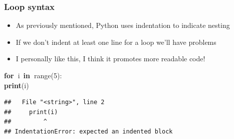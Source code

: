 \documentclass{beamer}\usepackage[]{graphicx}\usepackage[]{color}
\makeatletter
\newcommand{\hlnum}[1]{\textcolor[rgb]{0.686,0.059,0.569}{#1}}%
\newcommand{\hlopt}[1]{\textcolor[rgb]{0,0,0}{#1}}%
\newcommand{\hlstd}[1]{\textcolor[rgb]{0.345,0.345,0.345}{#1}}%
\newcommand{\hlkwa}[1]{\textcolor[rgb]{0.161,0.373,0.58}{\textbf{#1}}}%
\newcommand{\hlkwb}[1]{\textcolor[rgb]{0.69,0.353,0.396}{#1}}%
\newenvironment{kframe}{%
 \def\at@end@of@kframe{}%
 \ifinner\ifhmode%
  \def\at@end@of@kframe{\end{minipage}}%
  \begin{minipage}{\columnwidth}%
 \fi\fi%
 \def\FrameCommand##1{\hskip\@totalleftmargin \hskip-\fboxsep
 \colorbox{shadecolor}{##1}\hskip-\fboxsep
     \hskip-\linewidth \hskip-\@totalleftmargin \hskip\columnwidth}%
 \MakeFramed {\advance\hsize-\width
   \@totalleftmargin\z@ \linewidth\hsize
   \@setminipage}}%
 {\par\unskip\endMakeFramed%
 \at@end@of@kframe}
\newenvironment{knitrout}{}{} %
\makeatother
\begin{document}
\begin{frame}[fragile]
\frametitle{Loop syntax}
\begin{itemize}
	\item As previously mentioned, Python uses indentation to indicate nesting

	\item If we don't indent at least one line for a loop we'll have problems

	\item I personally like this, I think it promotes more readable code!

\end{itemize}
\begin{knitrout}
\color{fgcolor}\begin{kframe}
\noindent
\ttfamily
\hlstd{}\hlkwa{for\ }\hlstd{i\ }\hlkwa{in\ }\hlstd{}\hlkwb{range}\hlstd{}\hlopt{(}\hlstd{}\hlnum{5}\hlstd{}\hlopt{):}\hspace*{\fill}\\
\hlstd{}\hlkwa{print}\hlstd{}\hlopt{(}\hlstd{i}\hlopt{)}\hlstd{}\hspace*{\fill}
\mbox{}
\normalfont

\begin{verbatim}
##   File "<string>", line 2
##     print(i)
##         ^
## IndentationError: expected an indented block
\end{verbatim}
\end{kframe}
\end{knitrout}

\end{frame}
\end{document}
